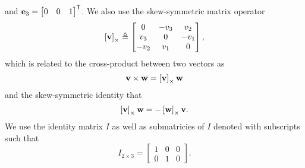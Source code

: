 and $\boldsymbol{\mathrm{e}}_3 = \begin{bmatrix} 0 & 0 & 1 \end{bmatrix}^{\mathsf{T}}$.
We also use the skew-symmetric matrix operator
\begin{equation}
  \left[ \boldsymbol{\mathrm{v}} \right]_{\times} \triangleq
  \begin{bmatrix}
  0 & -v_{3} & v_{2}\\
  v_{3} & 0 & -v_{1}\\
  -v_{2} & v_{1} & 0
  \end{bmatrix},
\end{equation}
which is related to the cross-product between two vectors as
\begin{equation}
  \boldsymbol{\mathrm{v}}\times\boldsymbol{\mathrm{w}}=\left[ \boldsymbol{\mathrm{v}} \right]_{\times}\boldsymbol{\mathrm{w}}
\end{equation}
and the skew-symmetric identity that
\begin{equation}
  \left[ \boldsymbol{\mathrm{v}} \right]_{\times} \boldsymbol{\mathrm{w}} = -\left[ \boldsymbol{\mathrm{w}} \right]_{\times} \boldsymbol{\mathrm{v}}.
\end{equation}
We use the identity matrix $I$ as well as submatricies of $I$ denoted with
subscripts such that
\begin{equation}
  I_{2 \times 3} =
  \begin{bmatrix}
    1 & 0 & 0 \\
    0 & 1 & 0
  \end{bmatrix}.
\end{equation}
